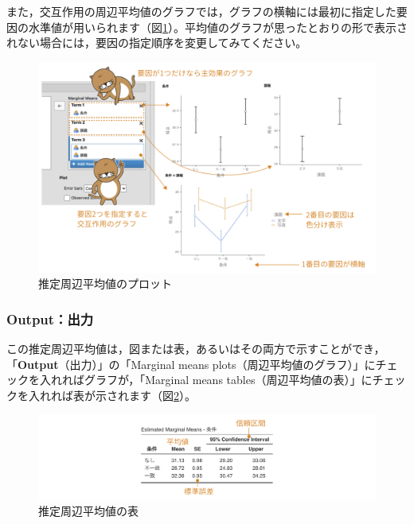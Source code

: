 \documentclass[
  12pt,
  a5jpaper,
  lualatex, ja=standard]{bxjsbook}
\begin{document}
また，交互作用の周辺平均値のグラフでは，グラフの横軸には最初に指定した要因の水準値が用いられます（図\ref{fig:ANOVA-anova-emm-plots}）。平均値のグラフが思ったとおりの形で表示されない場合には，要因の指定順序を変更してみてください。

\begin{figure}[!ht]

{\centering \includegraphics[width=1\linewidth]{images/ANOVA/anova-emm-plots} 

}

\caption{推定周辺平均値のプロット}\label{fig:ANOVA-anova-emm-plots}
\end{figure}

\hypertarget{outputux51faux529b}{%
\subsubsection*{Output：出力}\label{outputux51faux529b}}

この推定周辺平均値は，図または表，あるいはその両方で示すことができ，「\textbf{Output}（出力）」の「Marginal means plots（周辺平均値のグラフ）」にチェックを入れればグラフが，「Marginal means tables（周辺平均値の表）」にチェックを入れれば表が示されます（図\ref{fig:ANOVA-anova-emm-table}）。

\begin{figure}[!ht]

{\centering \includegraphics[width=1\linewidth]{images/ANOVA/anova-emm-table} 

}

\caption{推定周辺平均値の表}\label{fig:ANOVA-anova-emm-table}
\end{figure}
\end{document}
